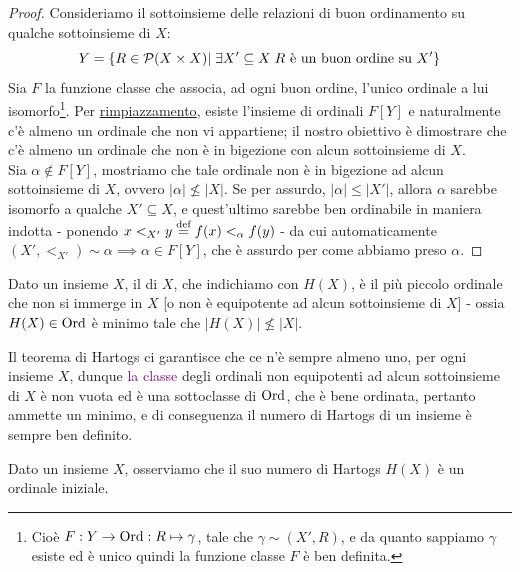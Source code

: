 \begin{proof}
	Consideriamo il sottoinsieme delle relazioni di buon ordinamento su qualche sottoinsieme di $X$:
	\[ Y = \{R \in \mathcal{P}(X \times X) |\; \exists X' \subseteq X \; \text{$R$ \`e un buon ordine su $X'$}\}
		\]
	Sia $F$ la funzione classe che associa, ad ogni buon ordine, l'unico ordinale a lui isomorfo\footnote{Cio\`e $F : Y \rightarrow \operatorname{Ord} : R \mapsto \gamma$, tale che $\gamma \sim (X',R)$, e da quanto sappiamo $\gamma$ esiste ed \`e unico quindi la funzione classe $F$ \`e ben definita.}.
	Per \hyperref[ax8]{rimpiazzamento}, esiste l'insieme di ordinali $F[Y]$ e naturalmente c'\`e almeno un ordinale che non vi appartiene; il nostro obiettivo \`e dimostrare che c'\`e almeno un ordinale che non \`e in bigezione con alcun sottoinsieme di $X$.\\
	Sia $\alpha \not \in F[Y]$, mostriamo che tale ordinale non \`e in bigezione ad alcun sottoinsieme di $X$, ovvero $|\alpha| \not\leq |X|$. Se per assurdo, $|\alpha| \leq |X'|$, allora $\alpha$ sarebbe isomorfo a qualche $X' \subseteq X$, e quest'ultimo sarebbe ben ordinabile in maniera indotta -
	ponendo $x <_{X'} y \overset{\text{def}}{=} f(x) <_\alpha f(y)$ - da cui automaticamente $(X',<_{X'}) \sim \alpha \implies \alpha \in F[Y]$, che \`e assurdo per come abbiamo preso $\alpha$.
\end{proof}

\begin{definition}
	Dato un insieme $X$, il  di $X$, che indichiamo con $H(X)$, \`e il pi\`u piccolo ordinale che non si immerge in $X$ [o non \`e equipotente ad alcun sottoinsieme di $X$] - ossia $H(X) \in \operatorname{Ord}$ \`e minimo tale che $|H(X)| \not\leq |X|$.
\end{definition}

\begin{remark}
	Il teorema di Hartogs ci garantisce che ce n'\`e sempre almeno uno, per ogni insieme $X$, dunque \textcolor{purple}{la classe} degli ordinali non equipotenti ad alcun sottoinsieme di $X$ \`e non vuota ed \`e una sottoclasse di $\operatorname{Ord}$, che \`e bene ordinata,
	pertanto ammette un minimo, e di conseguenza il numero di Hartogs di un insieme \`e sempre ben definito.
\end{remark}

\begin{remark}
	Dato un insieme $X$, osserviamo che il suo numero di Hartogs $H(X)$ \`e un ordinale iniziale.
\end{remark}

